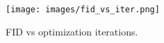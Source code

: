 \begin{figure}[t]
    \centering
    \texttt{[image: images/fid\_vs\_iter.png]}
\vspace{-2mm}
    \caption{FID vs optimization iterations.}
    \label{fig:fid_vs_optimization}
\vspace{-3mm}
\end{figure}


